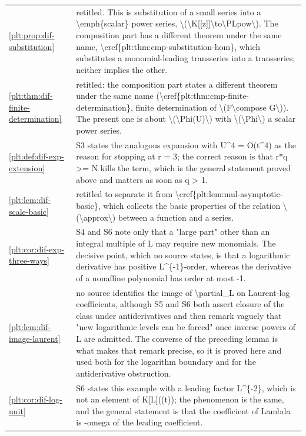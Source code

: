 \documentclass[11pt,oneside]{article}
\theoremstyle{plain}
\theoremstyle{definition}
\theoremstyle{remark}
\begin{document}
\begin{longtable}{@{}p{} p{}@{}}
\cref{plt:prop:dif-substitution} & retitled. This is substitution of a small series into a \textbackslash emph\{scalar\} power series, \textbackslash (\textbackslash K[[z]]\textbackslash to\textbackslash PLpow\textbackslash ). The composition part has a different theorem under the same name, \textbackslash cref\{plt:thm:cmp-substitution-hom\}, which substitutes a monomial-leading transseries into a transseries; neither implies the other.\\
\cref{plt:thm:dif-finite-determination} & retitled: the composition part states a different theorem under the same name (\textbackslash cref\{plt:thm:cmp-finite-determination\}, finite determination of \textbackslash (F\textbackslash compose G\textbackslash )). The present one is about \textbackslash (\textbackslash Phi(U)\textbackslash ) with \textbackslash (\textbackslash Phi\textbackslash ) a scalar power series.\\
\cref{plt:def:dif-exp-extension} & S3 states the analogous expansion with U\textasciicircum 4 = O(t\textasciicircum 4) as the reason for stopping at r = 3; the correct reason is that r*q >= N kills the term, which is the general statement proved above and matters as soon as q > 1.\\
\cref{plt:lem:dif-scale-basic} & retitled to separate it from \textbackslash cref\{plt:lem:mul-asymptotic-basic\}, which collects the basic properties of the relation \textbackslash (\textbackslash approx\textbackslash ) between a function and a series.\\
\cref{plt:cor:dif-exp-three-ways} & S4 and S6 note only that a "large part" other than an integral multiple of L may require new monomials. The decisive point, which no source states, is that a logarithmic derivative has positive L\textasciicircum \{-1\}-order, whereas the derivative of a nonaffine polynomial has order at most -1.\\
\cref{plt:lem:dif-image-laurent} & no source identifies the image of \textbackslash partial\_L on Laurent-log coefficients, although S5 and S6 both assert closure of the class under antiderivatives and then remark vaguely that "new logarithmic levels can be forced" once inverse powers of L are admitted. The converse of the preceding lemma is what makes that remark precise, so it is proved here and used both for the logarithm boundary and for the antiderivative obstruction.\\
\cref{plt:cor:dif-log-unit} & S6 states this example with a leading factor L\textasciicircum \{-2\}, which is not an element of K[L]((t)); the phenomenon is the same, and the general statement is that the coefficient of Lambda is -omega of the leading coefficient.\\

\end{longtable}
\end{document}
